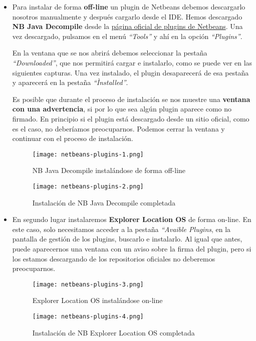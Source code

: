 \begin{itemize}
    \item Para instalar de forma \textbf{off-line} un plugin de Netbeans debemos descargarlo nosotros manualmente y después cargarlo desde el IDE. Hemos descargado \textbf{NB Java Decompile} desde la \href{https://plugins.netbeans.apache.org/catalogue/?id=80}{página oficial de plugins de Netbeans}. Una vez descargado, pulsamos en el menú \textit{``Tools''} y ahí en la opción \textit{``Plugins''}.

    En la ventana que se nos abrirá debemos seleccionar la pestaña \textit{``Downloaded''}, que nos permitirá cargar e instalarlo, como se puede ver en las siguientes capturas. Una vez instalado, el plugin desaparecerá de esa pestaña y aparecerá en la pestaña \textit{``Ìnstalled''}.

    Es posible que durante el proceso de instalación se nos muestre una \textbf{ventana con una advertencia}, si por lo que sea algún plugin aparece como no firmado. En principio si el plugin está descargado desde un sitio oficial, como es el caso, no deberíamos preocuparnos. Podemos cerrar la ventana y continuar con el proceso de instalación.

    \begin{figure}[H]
        \centering
        \texttt{[image: netbeans-plugins-1.png]}
        \caption{NB Java Decompile instalándose de forma off-line}
    \end{figure}

    \begin{figure}[H]
        \centering
        \texttt{[image: netbeans-plugins-2.png]}
        \caption{Instalación de NB Java Decompile completada}
    \end{figure}

    \item En segundo lugar instalaremos \textbf{Explorer Location OS} de forma on-line. En este caso, solo necesitamos acceder a la pestaña \textit{``Avaible Plugins}, en la pantalla de gestión de los plugins, buscarlo e instalarlo. Al igual que antes, puede aparecernos una ventana con un aviso sobre la firma del plugin, pero si los estamos descargando de los repositorios oficiales no deberemos preocuparnos.

     \begin{figure}[H]
        \centering
        \texttt{[image: netbeans-plugins-3.png]}
        \caption{Explorer Location OS instalándose on-line}
    \end{figure}

    \begin{figure}[H]
        \centering
        \texttt{[image: netbeans-plugins-4.png]}
        \caption{Instalación de NB Explorer Location OS completada}
    \end{figure}
\end{itemize}

